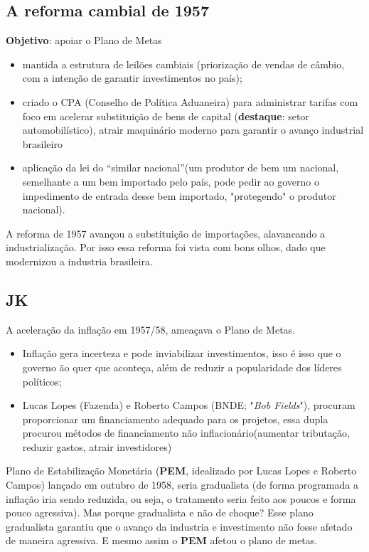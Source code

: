 \documentclass[a4paper,12pt]{article}[abntex2]
\begin{document}
\subsection{\textbf{A reforma cambial de 1957}}
\textbf{Objetivo}: apoiar o Plano de Metas\begin{itemize}
    \item mantida a estrutura de leilões cambiais (priorização de vendas de câmbio, com a intenção de garantir investimentos no país);
    \item criado o CPA (Conselho de Política Aduaneira) para administrar tarifas com foco em acelerar substituição de bens de capital (\textbf{destaque}: setor automobilístico), atrair maquinário moderno para garantir o avanço industrial brasileiro
    \item aplicação da lei do “similar nacional”(um produtor de bem um nacional, semelhante a um bem importado pelo país, pode pedir ao governo o impedimento de entrada desse bem importado, "protegendo" o produtor nacional).
\end{itemize}

A reforma de 1957 avançou a substituição de importações, alavancando a industrialização. Por isso essa reforma foi vista com bons olhos, dado que modernizou a industria brasileira.

\subsection{\textbf{JK}}
A aceleração da inflação em 1957/58, ameaçava o Plano de Metas. \begin{itemize}
    \item Inflação gera incerteza e pode inviabilizar investimentos, isso é isso que o governo ão quer que aconteça, além de reduzir a popularidade dos líderes políticos;
    \item Lucas Lopes (Fazenda) e Roberto Campos (BNDE; "\textit{Bob Fields}"), procuram proporcionar um financiamento adequado para os projetos, essa dupla procurou métodos de financiamento não inflacionário(aumentar tributação, reduzir gastos, atrair investidores) 
\end{itemize}

Plano de Estabilização Monetária (\textbf{PEM}, idealizado por Lucas Lopes e Roberto Campos) lançado em outubro de 1958, seria gradualista (de forma programada a inflação iria sendo reduzida, ou seja, o tratamento seria feito aos poucos e forma pouco agressiva). Mas porque gradualista e não de choque? Esse plano gradualista garantiu que o avanço da industria e investimento não fosse afetado de maneira agressiva. E mesmo assim o \textbf{PEM} afetou o plano de metas. 
\end{document}

